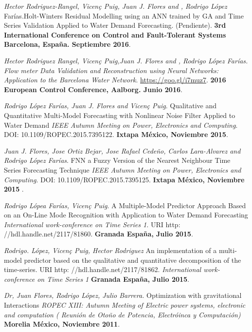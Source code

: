 \documentclass[7pt]{article}
\newenvironment{innerlist}[1][\enskip\textbullet]%
        {\begin{compactitem}[#1]}{\end{compactitem}}
\begin{document}
{\begin{innerlist}
\item \textit{Hector Rodriguez-Rangel, Vicen\c{c} Puig, Juan J. Flores and ,  Rodrigo L\'{o}pez} Far\'{i}as.Holt-Winters Residual Modelling using an ANN trained by GA and Time Series Validation Applied to Water Demand Forecasting. (Pendiente). \textbf{3rd International Conference on Control and Fault-Tolerant Systems} \textbf{Barcelona, España. Septiembre 2016}.

\item \textit{Hector Rodriguez Rangel, Vicen\c{c} Puig,Juan J. Flores and ,  Rodrigo L\'{o}pez Far\'{i}as.  Flow meter Data Validation and Reconstruction using Neural Networks: Application to the Barcelona Water Network}. \url{https://goo.gl/i7muz7}. \textbf{2016 European Control Conference, Aalborg. Junio 2016}.

\item \textit{Rodrigo L\'{o}pez Far\'{i}as, Juan J. Flores and Vicen\c{c} Puig}.  Qualitative and Quantitative Multi-Model Forecasting with Nonlinear Noise Filter Applied to Water Demand \textit{IEEE Autumn Meeting on Power, Electronics and Computing}. DOI: 10.1109/ROPEC.2015.7395122.  \textbf{Ixtapa M\'{e}xico, Noviembre 2015}.

\item \textit{Juan J. Flores, Jose Ortiz Bejar, Jose Rafael Cedeño, Carlos Lara-Alvarez and Rodrigo L\'{o}pez Far\'{i}as}. FNN a Fuzzy Version of the Nearest Neighbour Time Series Forecasting Technique \textit{IEEE Autumn Meeting on Power, Electronics and Computing}. DOI: 10.1109/ROPEC.2015.7395125. \textbf{Ixtapa M\'{e}xico, Noviembre 2015 }.

\item \textit{Rodrigo L\'{o}pea Far\'{i}as, Vicen\c{c} Puig}. A Multiple-Model Predictor Approach Based on an On-Line Mode Recognition with Application to Water Demand Forecasting \textit{International work-conference on Time Series 1. 
} URI http: //hdl.handle.net/2117/81860. \textbf{Granada España, Julio 2015}.

\item \textit{Rodrigo. L\'{o}pez, Vicen\c{c} Puig, Hector Rodriguez}   An implementation of a multi-model predictor based on the qualitative and quantitative decomposition of the time-series. URI http: //hdl.handle.net/2117/81862. \textit{International work-conference on Time Series 1 
} \textbf{Granada España, Julio 2015}.

\item \textit{Dr, Juan Flores, Rodrigo López, Julio Barrera.} Optimization with gravitational Interactions  \textit{ROPEC XIII: Autumn Meeting of Electric power systems, electronic and computation ( Reuni\'{o}n de Oto\~no de Potencia, Electr\'{o}inca y Computaci\'{o}n)} \textbf{ Morelia M\'{e}xico, Noviembre 2011}.


\end{innerlist}}
\end{document}
